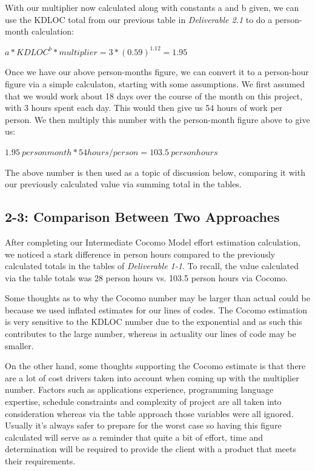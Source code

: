 \documentclass[11pt,a4paper]{article}
\begin{document}
With our multiplier now calculated along with constants a and b given, we can use the KDLOC total from our previous table in \textit{Deliverable 2.1} to do a person-month calculation: 

\begin{center}$a*KDLOC^b * multiplier = 3*(0.59)^{1.12} = 1.95 $
\end{center}

Once we have our above person-months figure, we can convert it to a person-hour figure via a simple calculaton, starting with some assumptions. We first assumed that we would work about 18 days over the course of the month on this project, with 3 hours spent each day. This would then give us 54 hours of work per person. We then multiply this number with the person-month figure above to give us:

\begin{center} $1.95 \ person month * 54 hours / person = 103.5 \ personhours$
\end{center}

The above number is then used as a topic of discussion below, comparing it with our previously calculated value via summing total in the tables.

\subsection*{2-3: Comparison Between Two Approaches}

After completing our Intermediate Cocomo Model effort estimation calculation, we noticed a stark difference in person hours compared to the previously calculated totals in the tables of \textit{Deliverable 1-1}. To recall, the value calculated via the table totals was 28 person hours vs. 103.5 person hours via Cocomo. 

Some thoughts as to why the Cocomo number may be larger than actual could be because we used inflated estimates for our lines of codes. The Cocomo estimation is very sensitive to the KDLOC number due to the exponential and as such this contributes to the large number, whereas in actuality our lines of code may be smaller. 

On the other hand, some thoughts supporting the Cocomo estimate is that there are a lot of cost drivers taken into account when coming up with the multiplier number. Factors such as applications experience, programming language expertise, schedule constraints and complexity of project are all taken into consideration whereas via the table approach those variables were all ignored. Usually it's always safer to prepare for the worst case so having this figure calculated will serve as a reminder that quite a bit of effort, time and determination will be required to provide the client with a product that meets their requirements. 
\end{document}
